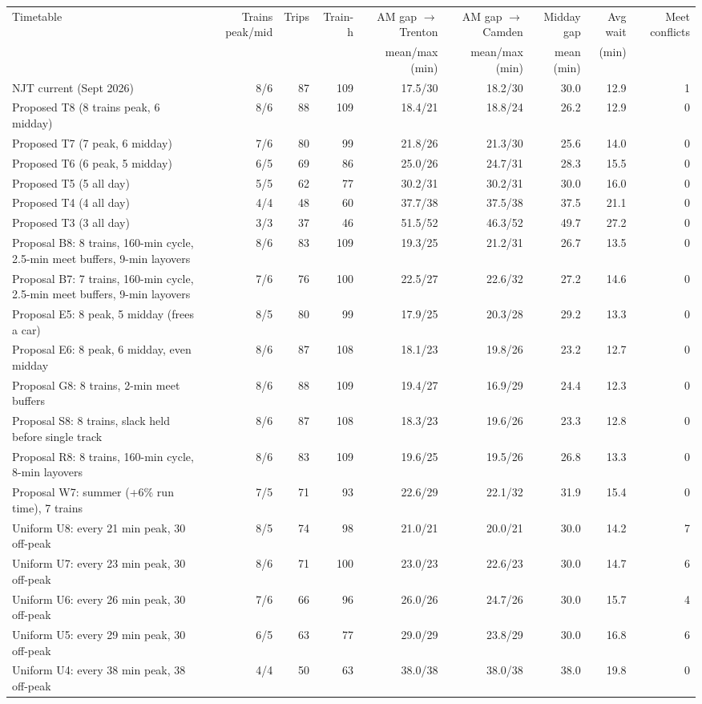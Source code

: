 \documentclass[10pt,landscape]{article}
\begin{document}
\begin{center}\small
\begin{tabular}{@{}lrrrrrrrr@{}}\toprule
Timetable & Trains peak/mid & Trips & Train-h & AM gap $\to$Trenton & AM gap $\to$Camden & Midday gap & Avg wait & Meet conflicts\\
 & & & & mean/max (min) & mean/max (min) & mean (min) & (min) & \\\midrule
NJT current (Sept 2026) & 8/6 & 87 & 109 & 17.5/30 & 18.2/30 & 30.0 & 12.9 & 1 \\
Proposed T8 (8 trains peak, 6 midday) & 8/6 & 88 & 109 & 18.4/21 & 18.8/24 & 26.2 & 12.9 & 0 \\
Proposed T7 (7 peak, 6 midday) & 7/6 & 80 & 99 & 21.8/26 & 21.3/30 & 25.6 & 14.0 & 0 \\
Proposed T6 (6 peak, 5 midday) & 6/5 & 69 & 86 & 25.0/26 & 24.7/31 & 28.3 & 15.5 & 0 \\
Proposed T5 (5 all day) & 5/5 & 62 & 77 & 30.2/31 & 30.2/31 & 30.0 & 16.0 & 0 \\
Proposed T4 (4 all day) & 4/4 & 48 & 60 & 37.7/38 & 37.5/38 & 37.5 & 21.1 & 0 \\
Proposed T3 (3 all day) & 3/3 & 37 & 46 & 51.5/52 & 46.3/52 & 49.7 & 27.2 & 0 \\
Proposal B8: 8 trains, 160-min cycle, 2.5-min meet buffers, 9-min layovers & 8/6 & 83 & 109 & 19.3/25 & 21.2/31 & 26.7 & 13.5 & 0 \\
Proposal B7: 7 trains, 160-min cycle, 2.5-min meet buffers, 9-min layovers & 7/6 & 76 & 100 & 22.5/27 & 22.6/32 & 27.2 & 14.6 & 0 \\
Proposal E5: 8 peak, 5 midday (frees a car) & 8/5 & 80 & 99 & 17.9/25 & 20.3/28 & 29.2 & 13.3 & 0 \\
Proposal E6: 8 peak, 6 midday, even midday & 8/6 & 87 & 108 & 18.1/23 & 19.8/26 & 23.2 & 12.7 & 0 \\
Proposal G8: 8 trains, 2-min meet buffers & 8/6 & 88 & 109 & 19.4/27 & 16.9/29 & 24.4 & 12.3 & 0 \\
Proposal S8: 8 trains, slack held before single track & 8/6 & 87 & 108 & 18.3/23 & 19.6/26 & 23.3 & 12.8 & 0 \\
Proposal R8: 8 trains, 160-min cycle, 8-min layovers & 8/6 & 83 & 109 & 19.6/25 & 19.5/26 & 26.8 & 13.3 & 0 \\
Proposal W7: summer (+6\% run time), 7 trains & 7/5 & 71 & 93 & 22.6/29 & 22.1/32 & 31.9 & 15.4 & 0 \\
Uniform U8: every 21 min peak, 30 off-peak & 8/5 & 74 & 98 & 21.0/21 & 20.0/21 & 30.0 & 14.2 & 7 \\
Uniform U7: every 23 min peak, 30 off-peak & 8/6 & 71 & 100 & 23.0/23 & 22.6/23 & 30.0 & 14.7 & 6 \\
Uniform U6: every 26 min peak, 30 off-peak & 7/6 & 66 & 96 & 26.0/26 & 24.7/26 & 30.0 & 15.7 & 4 \\
Uniform U5: every 29 min peak, 30 off-peak & 6/5 & 63 & 77 & 29.0/29 & 23.8/29 & 30.0 & 16.8 & 6 \\
Uniform U4: every 38 min peak, 38 off-peak & 4/4 & 50 & 63 & 38.0/38 & 38.0/38 & 38.0 & 19.8 & 0 \\
\bottomrule\end{tabular}\end{center}
\end{document}
